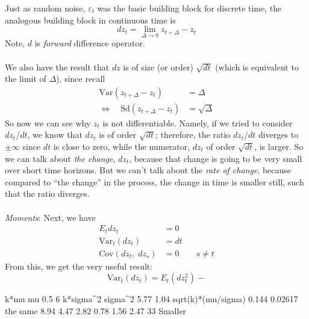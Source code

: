 \documentclass[a4paper,12pt]{scrartcl}
\begin{document}
Just as random noise, $\varepsilon_t$ was the basic building block
for discrete time, the analogous building block in continuous time is
\begin{equation}
    dz_t = \lim_{\Delta \rightarrow 0} z_{t + \Delta} - z_t
\end{equation}
Note, $d$ is \emph{forward} difference operator.
\\
\\
We also have the result that $dz$ is of size (or order) $\sqrt{dt}$ 
(which is equivalent to the limit of $\Delta$), since recall
\begin{align*}
    \text{Var}(z_{t + \Delta} - z_t) &= \Delta \\
    \Leftrightarrow \quad \text{Sd}(z_{t + \Delta} - z_t) &= 
	\sqrt{\Delta}
\end{align*}
So now we can see why $z_t$ is not differentiable.  Namely, if 
we tried to consider $dz_t/dt$, we know that $dz_t$ is of order
$\sqrt{dt}$; therefore, the ratio $dz_t/dt$ diverges to $\pm \infty$
since $dt$ is close to zero, while the numerator, $dz_t$ of order
$\sqrt{dt}$, is larger. So we can talk about \emph{the change}, $dz_t$,
because that change is going to be very small over short time horizons.
But we can't talk about the \emph{rate of change}, because compared
to ``the change'' in the process, the change in time is smaller still,
such that the ratio diverges.
\\
\\
{\sl Moments}: Next, we have
\begin{align*}
    E_t dz_t &= 0 \\
    \text{Var}_t(dz_t) &= dt \\
    \text{Cov}(dz_t, \; dz_s) &= 0 \qquad s\neq t
\end{align*}
From this, we get the very useful result:
\begin{equation}
    \text{Var}_t(dz_t) = E_t(dz^2_t) - 
\end{equation}



k*mu
mu
0.5 6
k*sigma^2
sigma^2
5.77 1.04
sqrt(k)*(mu/sigma)
0.144 0.02617
the same
8.94 4.47 2.82 0.78 1.56 2.47
33
Smaller




% 
\end{document}

